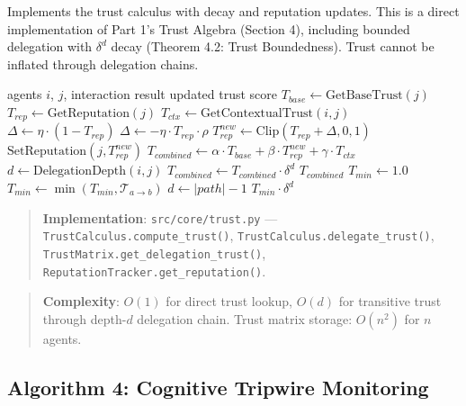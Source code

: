\documentclass[
]{article}
\begin{document}
Implements the trust calculus with decay and reputation updates. This is
a direct implementation of Part 1's Trust Algebra (Section 4), including
bounded delegation with \(\delta^d\) decay (Theorem 4.2: Trust
Boundedness). Trust cannot be inflated through delegation chains.

\begin{algorithm}
\caption{Trust Update Operations}
\label{alg:trust-impl}
\begin{algorithmic}[1]
\Require agents $i$, $j$, interaction result
\Ensure updated trust score
  \State $T_{base} \gets \text{GetBaseTrust}(j)$
  \State $T_{rep} \gets \text{GetReputation}(j)$
  \State $T_{ctx} \gets \text{GetContextualTrust}(i, j)$
    \State $\Delta \gets \eta \cdot (1 - T_{rep})$
  \Else
    \State $\Delta \gets -\eta \cdot T_{rep} \cdot \rho$
  \EndIf
  \State $T_{rep}^{new} \gets \text{Clip}(T_{rep} + \Delta, 0, 1)$
  \State $\text{SetReputation}(j, T_{rep}^{new})$
  \State $T_{combined} \gets \alpha \cdot T_{base} + \beta \cdot T_{rep}^{new} + \gamma \cdot T_{ctx}$
    \State $d \gets \text{DelegationDepth}(i, j)$
    \State $T_{combined} \gets T_{combined} \cdot \delta^d$
  \EndIf
  \Return $T_{combined}$
\EndFunction
{}
  \State $T_{min} \gets 1.0$
    \State $T_{min} \gets \min(T_{min}, \mathcal{T}_{a \to b})$
  \EndFor
  \State $d \gets |path| - 1$
  \Return $T_{min} \cdot \delta^d$
\EndFunction
\end{algorithmic}
\end{algorithm}

\begin{quote}
\textbf{Implementation}: \texttt{src/core/trust.py} ---
\texttt{TrustCalculus.compute\_trust()},
\texttt{TrustCalculus.delegate\_trust()},
\texttt{TrustMatrix.get\_delegation\_trust()},
\texttt{ReputationTracker.get\_reputation()}.
\end{quote}

\begin{quote}
\textbf{Complexity}: \(O(1)\) for direct trust lookup, \(O(d)\) for
transitive trust through depth-\(d\) delegation chain. Trust matrix
storage: \(O(n^2)\) for \(n\) agents.
\end{quote}

\subsection{Algorithm 4: Cognitive Tripwire
Monitoring}\label{sec:alg-tripwire}
\end{document}

